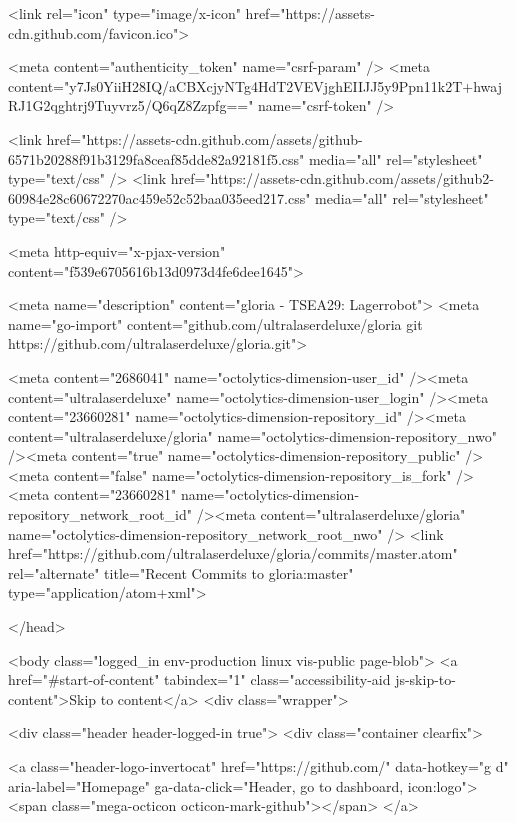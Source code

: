     
    
    <link rel="icon" type="image/x-icon" href="https://assets-cdn.github.com/favicon.ico">


    <meta content="authenticity_token" name="csrf-param" />
<meta content="y7Js0YiiH28IQ/aCBXcjyNTg4HdT2VEVjghEIIJJ5y9Ppn11k2T+hwajRJ1G2qghtrj9Tuyvrz5/Q6qZ8Zzpfg==" name="csrf-token" />

    <link href="https://assets-cdn.github.com/assets/github-6571b20288f91b3129fa8ceaf85dde82a92181f5.css" media="all" rel="stylesheet" type="text/css" />
    <link href="https://assets-cdn.github.com/assets/github2-60984e28c60672270ac459e52c52baa035eed217.css" media="all" rel="stylesheet" type="text/css" />
    


    <meta http-equiv="x-pjax-version" content="f539e6705616b13d0973d4fe6dee1645">

      
  <meta name="description" content="gloria - TSEA29: Lagerrobot">
  <meta name="go-import" content="github.com/ultralaserdeluxe/gloria git https://github.com/ultralaserdeluxe/gloria.git">

  <meta content="2686041" name="octolytics-dimension-user_id" /><meta content="ultralaserdeluxe" name="octolytics-dimension-user_login" /><meta content="23660281" name="octolytics-dimension-repository_id" /><meta content="ultralaserdeluxe/gloria" name="octolytics-dimension-repository_nwo" /><meta content="true" name="octolytics-dimension-repository_public" /><meta content="false" name="octolytics-dimension-repository_is_fork" /><meta content="23660281" name="octolytics-dimension-repository_network_root_id" /><meta content="ultralaserdeluxe/gloria" name="octolytics-dimension-repository_network_root_nwo" />
  <link href="https://github.com/ultralaserdeluxe/gloria/commits/master.atom" rel="alternate" title="Recent Commits to gloria:master" type="application/atom+xml">

  </head>


  <body class="logged_in  env-production linux vis-public page-blob">
    <a href="#start-of-content" tabindex="1" class="accessibility-aid js-skip-to-content">Skip to content</a>
    <div class="wrapper">
      
      
      
      


      <div class="header header-logged-in true">
  <div class="container clearfix">

    <a class="header-logo-invertocat" href="https://github.com/" data-hotkey="g d" aria-label="Homepage" ga-data-click="Header, go to dashboard, icon:logo">
  <span class="mega-octicon octicon-mark-github"></span>
</a>


